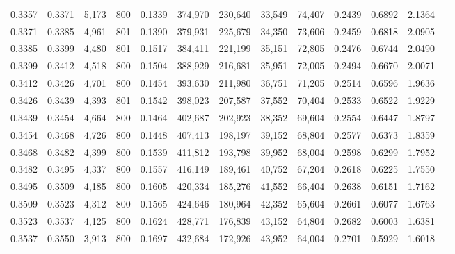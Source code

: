 \begin{tabular}{rrrrrrrrrrrrr}
0.3357 & 0.3371 &  5,173 &   800 &                                     0.1339 & 374,970 & 230,640 &  33,549 &  74,407 & 0.2439 & 0.6892 & 2.1364 \\
0.3371 & 0.3385 &  4,961 &   801 &                                     0.1390 & 379,931 & 225,679 &  34,350 &  73,606 & 0.2459 & 0.6818 & 2.0905 \\
0.3385 & 0.3399 &  4,480 &   801 &                                     0.1517 & 384,411 & 221,199 &  35,151 &  72,805 & 0.2476 & 0.6744 & 2.0490 \\
0.3399 & 0.3412 &  4,518 &   800 &                                     0.1504 & 388,929 & 216,681 &  35,951 &  72,005 & 0.2494 & 0.6670 & 2.0071 \\
0.3412 & 0.3426 &  4,701 &   800 &                                     0.1454 & 393,630 & 211,980 &  36,751 &  71,205 & 0.2514 & 0.6596 & 1.9636 \\
0.3426 & 0.3439 &  4,393 &   801 &                                     0.1542 & 398,023 & 207,587 &  37,552 &  70,404 & 0.2533 & 0.6522 & 1.9229 \\
0.3439 & 0.3454 &  4,664 &   800 &                                     0.1464 & 402,687 & 202,923 &  38,352 &  69,604 & 0.2554 & 0.6447 & 1.8797 \\
0.3454 & 0.3468 &  4,726 &   800 &                                     0.1448 & 407,413 & 198,197 &  39,152 &  68,804 & 0.2577 & 0.6373 & 1.8359 \\
0.3468 & 0.3482 &  4,399 &   800 &                                     0.1539 & 411,812 & 193,798 &  39,952 &  68,004 & 0.2598 & 0.6299 & 1.7952 \\
0.3482 & 0.3495 &  4,337 &   800 &                                     0.1557 & 416,149 & 189,461 &  40,752 &  67,204 & 0.2618 & 0.6225 & 1.7550 \\
0.3495 & 0.3509 &  4,185 &   800 &                                     0.1605 & 420,334 & 185,276 &  41,552 &  66,404 & 0.2638 & 0.6151 & 1.7162 \\
0.3509 & 0.3523 &  4,312 &   800 &                                     0.1565 & 424,646 & 180,964 &  42,352 &  65,604 & 0.2661 & 0.6077 & 1.6763 \\
0.3523 & 0.3537 &  4,125 &   800 &                                     0.1624 & 428,771 & 176,839 &  43,152 &  64,804 & 0.2682 & 0.6003 & 1.6381 \\
0.3537 & 0.3550 &  3,913 &   800 &                                     0.1697 & 432,684 & 172,926 &  43,952 &  64,004 & 0.2701 & 0.5929 & 1.6018 \\

\end{tabular}
